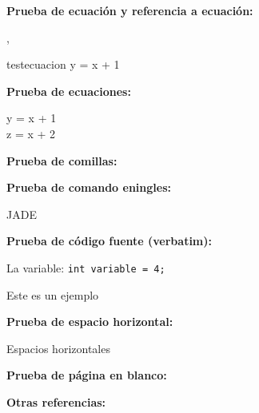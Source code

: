\espaciodoble\textbf{Prueba de ecuación y referencia a ecuación:}

, 

\begin{ecuacion}{testecuacion}
	y = x + 1
\end{ecuacion}

\espaciodoble\textbf{Prueba de ecuaciones:}

\begin{ecuaciones}
	y = x + 1 \\
	z = x + 2
\end{ecuaciones}

\espaciodoble\textbf{Prueba de comillas:}


\espaciodoble\textbf{Prueba de comando eningles:}

JADE 

\espaciodoble\textbf{Prueba de código fuente (verbatim):}

La variable: \verb|int variable = 4;|

Este es un ejemplo

\espaciodoble\textbf{Prueba de espacio horizontal:}

Espacios  horizontales

\espaciodoble\textbf{Prueba de página en blanco:}
\pagenblanco

\espaciodoble\textbf{Otras referencias:}

\cite{bond2014readings}

\cite{ashton2009internet}

\cite{balaji2010introduction}

\cite{causa2007computacion}

\cite{cuevas2015emociones}

\cite{dias2014fatima}

\cite{gil2015architecture}

\cite{jennings1998roadmap}

\cite{jiang2007ebdi}

\cite{maria2007emotional}

\cite{ortony1990cognitive}

\cite{perozo2008proposal}

\cite{perozo2011modelado}

\cite{perozo2012affective}

\cite{perozo2013self}

